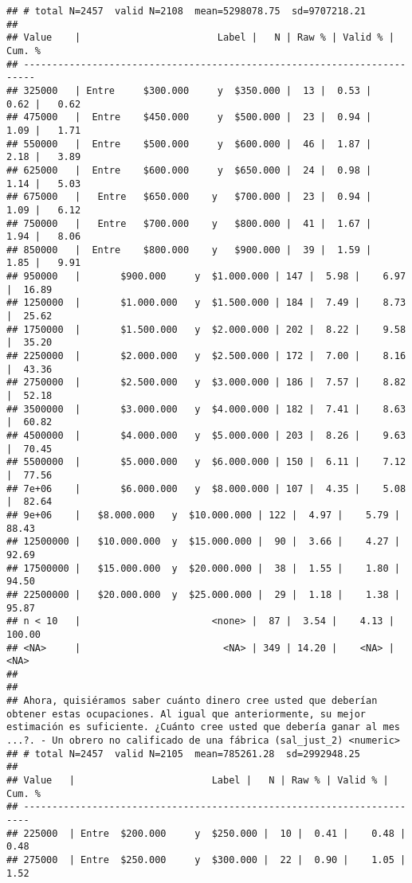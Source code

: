 \documentclass[
  10,
  landscape,
  legalpaper]{article}
\begin{document}
\begin{verbatim}
## # total N=2457  valid N=2108  mean=5298078.75  sd=9707218.21
## 
## Value    |                        Label |   N | Raw % | Valid % | Cum. %
## ------------------------------------------------------------------------
## 325000   | Entre     $300.000     y  $350.000 |  13 |  0.53 |    0.62 |   0.62
## 475000   |  Entre    $450.000     y  $500.000 |  23 |  0.94 |    1.09 |   1.71
## 550000   |  Entre    $500.000     y  $600.000 |  46 |  1.87 |    2.18 |   3.89
## 625000   |  Entre    $600.000     y  $650.000 |  24 |  0.98 |    1.14 |   5.03
## 675000   |   Entre   $650.000    y   $700.000 |  23 |  0.94 |    1.09 |   6.12
## 750000   |   Entre   $700.000    y   $800.000 |  41 |  1.67 |    1.94 |   8.06
## 850000   |  Entre    $800.000    y   $900.000 |  39 |  1.59 |    1.85 |   9.91
## 950000   |       $900.000     y  $1.000.000 | 147 |  5.98 |    6.97 |  16.89
## 1250000  |       $1.000.000   y  $1.500.000 | 184 |  7.49 |    8.73 |  25.62
## 1750000  |       $1.500.000   y  $2.000.000 | 202 |  8.22 |    9.58 |  35.20
## 2250000  |       $2.000.000   y  $2.500.000 | 172 |  7.00 |    8.16 |  43.36
## 2750000  |       $2.500.000   y  $3.000.000 | 186 |  7.57 |    8.82 |  52.18
## 3500000  |       $3.000.000   y  $4.000.000 | 182 |  7.41 |    8.63 |  60.82
## 4500000  |       $4.000.000   y  $5.000.000 | 203 |  8.26 |    9.63 |  70.45
## 5500000  |       $5.000.000   y  $6.000.000 | 150 |  6.11 |    7.12 |  77.56
## 7e+06    |       $6.000.000   y  $8.000.000 | 107 |  4.35 |    5.08 |  82.64
## 9e+06    |   $8.000.000   y  $10.000.000 | 122 |  4.97 |    5.79 |  88.43
## 12500000 |   $10.000.000  y  $15.000.000 |  90 |  3.66 |    4.27 |  92.69
## 17500000 |   $15.000.000  y  $20.000.000 |  38 |  1.55 |    1.80 |  94.50
## 22500000 |   $20.000.000  y  $25.000.000 |  29 |  1.18 |    1.38 |  95.87
## n < 10   |                       <none> |  87 |  3.54 |    4.13 | 100.00
## <NA>     |                         <NA> | 349 | 14.20 |    <NA> |   <NA>
## 
## 
## Ahora, quisiéramos saber cuánto dinero cree usted que deberían obtener estas ocupaciones. Al igual que anteriormente, su mejor estimación es suficiente. ¿Cuánto cree usted que debería ganar al mes ...?. - Un obrero no calificado de una fábrica (sal_just_2) <numeric>
## # total N=2457  valid N=2105  mean=785261.28  sd=2992948.25
## 
## Value   |                        Label |   N | Raw % | Valid % | Cum. %
## -----------------------------------------------------------------------
## 225000  | Entre  $200.000     y  $250.000 |  10 |  0.41 |    0.48 |   0.48
## 275000  | Entre  $250.000     y  $300.000 |  22 |  0.90 |    1.05 |   1.52

\end{verbatim}
\end{document}
